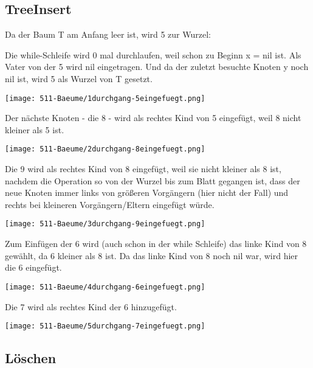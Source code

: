 \subsection{TreeInsert}

Da der Baum T am Anfang leer ist, wird 5 zur Wurzel:

Die while-Schleife wird 0 mal durchlaufen, weil schon zu Beginn x = nil ist. Als Vater von der 5 wird nil eingetragen. Und da der zuletzt besuchte Knoten y noch nil ist, wird 5 als Wurzel von T gesetzt.

\begin{center}
\texttt{[image: 511-Baeume/1durchgang-5eingefuegt.png]}
\end{center}

Der nächste Knoten - die 8 - wird als rechtes Kind von 5 eingefügt, weil 8 nicht kleiner als 5 ist.

\begin{center}
\texttt{[image: 511-Baeume/2durchgang-8eingefuegt.png]}
\end{center}

Die 9 wird als rechtes Kind von 8 eingefügt, weil sie nicht kleiner als 8 ist, nachdem die Operation so von der Wurzel bis zum Blatt gegangen ist, dass der neue Knoten immer links von größeren Vorgängern (hier nicht der Fall) und rechts bei kleineren Vorgängern/Eltern eingefügt würde.

\begin{center}
\texttt{[image: 511-Baeume/3durchgang-9eingefuegt.png]}
\end{center}

Zum Einfügen der 6 wird (auch schon in der while Schleife) das linke Kind von 8 gewählt, da 6 kleiner als 8 ist. Da das linke Kind von 8 noch nil war, wird hier die 6 eingefügt.

\begin{center}
\texttt{[image: 511-Baeume/4durchgang-6eingefuegt.png]}
\end{center}

Die 7 wird als rechtes Kind der 6 hinzugefügt.

\begin{center}
\texttt{[image: 511-Baeume/5durchgang-7eingefuegt.png]}
\end{center}


\subsection{Löschen}

